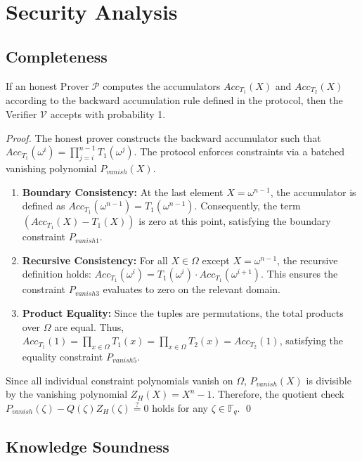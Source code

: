\section{Security Analysis}

\subsection{Completeness}

\begin{theorem}[Completeness]
    If an honest Prover $\mathcal{P}$ computes the accumulators $Acc_{T_1}(X)$ and $Acc_{T_2}(X)$ according to the backward accumulation rule defined in the protocol, then the Verifier $\mathcal{V}$ accepts with probability 1.
\end{theorem}

\begin{proof}
    The honest prover constructs the backward accumulator such that $Acc_{T_1}(\omega^i) = \prod_{j=i}^{n-1} T_1(\omega^j)$. The protocol enforces constraints via a batched vanishing polynomial $P_{vanish}(X)$.
    \begin{enumerate}
        \item \textbf{Boundary Consistency:} At the last element $X = \omega^{n-1}$, the accumulator is defined as $Acc_{T_1}(\omega^{n-1}) = T_1(\omega^{n-1})$. Consequently, the term $(Acc_{T_1}(X) - T_1(X))$ is zero at this point, satisfying the boundary constraint $P_{vanish1}$.
        \item \textbf{Recursive Consistency:} For all $X \in \Omega$ except $X=\omega^{n-1}$, the recursive definition holds: $Acc_{T_1}(\omega^i) = T_1(\omega^i) \cdot Acc_{T_1}(\omega^{i+1})$. This ensures the constraint $P_{vanish3}$ evaluates to zero on the relevant domain.
        \item \textbf{Product Equality:} Since the tuples are permutations, the total products over $\Omega$ are equal. Thus, $Acc_{T_1}(1) = \prod_{x \in \Omega} T_1(x) = \prod_{x \in \Omega} T_2(x) = Acc_{T_2}(1)$, satisfying the equality constraint $P_{vanish5}$.
    \end{enumerate}
    Since all individual constraint polynomials vanish on $\Omega$, $P_{vanish}(X)$ is divisible by the vanishing polynomial $Z_H(X) = X^n - 1$. Therefore, the quotient check $P_{vanish}(\zeta) - Q(\zeta)Z_H(\zeta) \stackrel{?}{=} 0$ holds for any $\zeta \in \mathbb{F}_q$.
    \qed
\end{proof}

\subsection{Knowledge Soundness}

